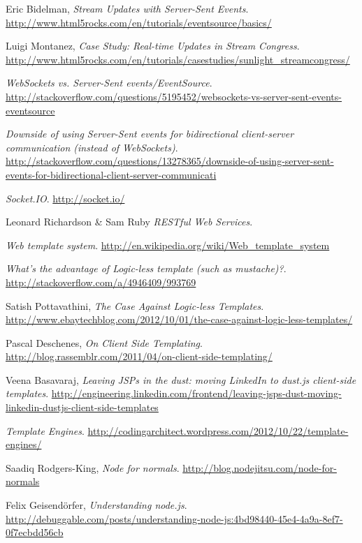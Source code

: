 \documentclass[doc,helv,longtable]{article}
\begin{document}
\begin{thebibliography}{150}
  Eric Bidelman,
  \emph{Stream Updates with Server-Sent Events}.
  \url{http://www.html5rocks.com/en/tutorials/eventsource/basics/}

  Luigi Montanez,
  \emph{Case Study: Real-time Updates in Stream Congress}.
  \url{http://www.html5rocks.com/en/tutorials/casestudies/sunlight_streamcongress/}

  \emph{WebSockets vs. Server-Sent events/EventSource}.
  \url{http://stackoverflow.com/questions/5195452/websockets-vs-server-sent-events-eventsource}

  \emph{Downside of using Server-Sent events for bidirectional client-server communication (instead of WebSockets)}.
  \url{http://stackoverflow.com/questions/13278365/downside-of-using-server-sent-events-for-bidirectional-client-server-communicati}

  \emph{Socket.IO}.
  \url{http://socket.io/}

  Leonard Richardson & Sam Ruby
  \emph{RESTful Web Services}.

  \emph{Web template system}.
  \url{http://en.wikipedia.org/wiki/Web_template_system}

  \emph{What's the advantage of Logic-less template (such as mustache)?}.
  \url{http://stackoverflow.com/a/4946409/993769}

  Satish Pottavathini,
  \emph{The Case Against Logic-less Templates}.
  \url{http://www.ebaytechblog.com/2012/10/01/the-case-against-logic-less-templates/}

  Pascal Deschenes,
  \emph{On Client Side Templating}.
  \url{http://blog.rassemblr.com/2011/04/on-client-side-templating/}

  Veena Basavaraj,
  \emph{Leaving JSPs in the dust: moving LinkedIn to dust.js client-side templates}.
  \url{http://engineering.linkedin.com/frontend/leaving-jsps-dust-moving-linkedin-dustjs-client-side-templates}

  \emph{Template Engines}.
  \url{http://codingarchitect.wordpress.com/2012/10/22/template-engines/}

  Saadiq Rodgers-King,
  \emph{Node for normals}.
  \url{http://blog.nodejitsu.com/node-for-normals}

  Felix Geisendörfer,
  \emph{Understanding node.js}.
  \url{http://debuggable.com/posts/understanding-node-js:4bd98440-45e4-4a9a-8ef7-0f7ecbdd56cb}


\end{thebibliography}
\end{document}
